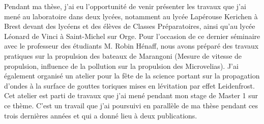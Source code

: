 \documentclass[french, 10pt]{article}
\begin{document}
Pendant ma thèse, j'ai eu l'opportunité de venir présenter les travaux que j'ai mené au laboratoire dans deux lycées, notamment au lycée Lapérouse Kerichen à Brest devant des lycéens et des élèves de Classes Préparatoires, ainsi qu'au lycée Léonard de Vinci à Saint-Michel sur Orge. Pour l'occasion de ce dernier séminaire avec le professeur des étudiants M. Robin Hénaff, nous avons préparé des travaux pratiques sur la propulsion des bateaux de Marangoni (Mesure de vitesse de propulsion, influence de la pollution sur la propulsion des Microvelias). J'ai également organisé un atelier pour la fête de la science portant sur la propagation d'ondes à la surface de gouttes toriques mises en lévitation par effet Leidenfrost. Cet atelier est parti de travaux que j'ai mené pendant mon stage de Master 1 sur ce thème. C'est un travail que j'ai poursuivi en parallèle de ma thèse pendant ces trois dernières années et qui a donné lieu à deux publications.



  


\end{document}
